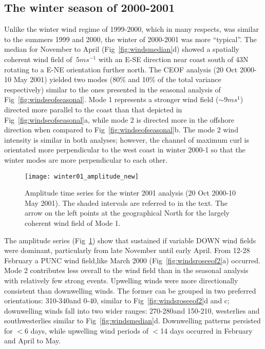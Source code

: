 \subsection{The winter season of 2000-2001}
Unlike the winter wind regime of 1999-2000, which in many
respects, was similar to the summers 1999 and 2000,  the winter of
2000-2001 was more ``typical''. The median for November to April
(Fig~\ref{fig:windsmedian}d) showed a spatially coherent wind
field of $~5ms^{-1}$ with an E-SE direction near coast south of
43\deg N rotating to a E-NE orientation further north. The CEOF
analysis (20 Oct 2000-10 May 2001) yielded two modes (80\% and
10\% of the total variance respectively) similar to the ones
presented in the seasonal analysis of
Fig~\ref{fig:windseofseasonal}. Mode 1 represents a stronger wind
field ($\sim 9ms^1$) directed more parallel to the coast than that
depicted in Fig~\ref{fig:windseofseasonal}a, while mode 2 is
directed more in the offshore direction when compared to
Fig~\ref{fig:windseofseasonal}b. The mode 2 wind intensity is
similar in both analyses; however, the channel of maximum curl is
orientated more perpendicular to the west coast in winter 2000-1
so that the winter modes are more perpendicular to each other.
\begin{figure}
\centering
\texttt{[image: winter01\_amplitude\_new]}
\caption{Amplitude time series for the winter 2001 analysis (20
Oct 2000-10 May 2001). The shaded intervals are referred to in the
text. The arrow on the left points at the geographical North for
the largely coherent wind field of Mode 1.}
\label{fig:winter_01_amp}
\end{figure}

The amplitude series ({Fig~\ref{fig:winter_01_amp}}) show that
sustained if variable DOWN wind fields were dominant, particularly
from late November until early April. From 12-28 February a PUNC
wind field,like March 2000 (Fig~\ref{fig:windsroseeof2}a)
occurred. Mode 2 contributes less overall to the wind field than
in the seasonal analysis with relatively few strong events.
Upwelling winds were more directionally consistent than
downwelling winds. The former can be grouped in two preferred
orientations: 310-340\deg and 0-40\deg, similar to
Fig~\ref{fig:windsroseeof2}d and c; downwelling winds fall into
two wider ranges: 270-280\deg  and 150-210\deg, westerlies and
southwesterlies similar to Fig~\ref{fig:windsmedian}d. Downwelling
patterns persisted for $<$6 days, while upwelling wind periods of
$<$14 days occurred in February and April to May.

